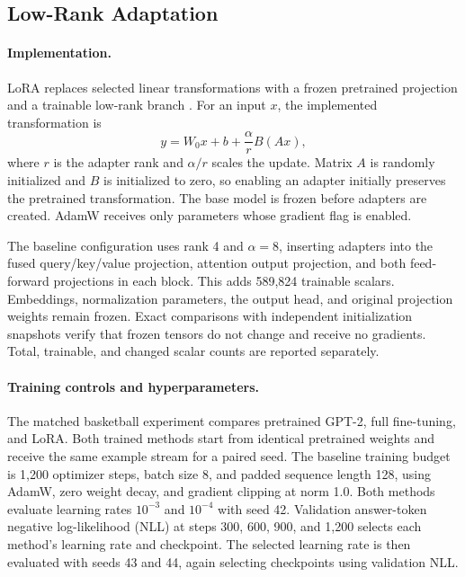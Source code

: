 \subsection{Low-Rank Adaptation}
\label{sec:method_lora}

\paragraph{Implementation.}
LoRA replaces selected linear transformations with a frozen pretrained projection and a trainable low-rank branch \cite{hu2021lora}. For an input $x$, the implemented transformation is
\begin{equation}
 y=W_0x+b+\frac{\alpha}{r}B(Ax),
\end{equation}
where $r$ is the adapter rank and $\alpha/r$ scales the update. Matrix $A$ is randomly initialized and $B$ is initialized to zero, so enabling an adapter initially preserves the pretrained transformation. The base model is frozen before adapters are created. AdamW receives only parameters whose gradient flag is enabled.

The baseline configuration uses rank 4 and $\alpha=8$, inserting adapters into the fused query/key/value projection, attention output projection, and both feed-forward projections in each block. This adds 589,824 trainable scalars. Embeddings, normalization parameters, the output head, and original projection weights remain frozen. Exact comparisons with independent initialization snapshots verify that frozen tensors do not change and receive no gradients. Total, trainable, and changed scalar counts are reported separately.

\paragraph{Training controls and hyperparameters.}
The matched basketball experiment compares pretrained GPT-2, full fine-tuning, and LoRA. Both trained methods start from identical pretrained weights and receive the same example stream for a paired seed. The baseline training budget is 1,200 optimizer steps, batch size 8, and padded sequence length 128, using AdamW, zero weight decay, and gradient clipping at norm 1.0. Both methods evaluate learning rates $10^{-3}$ and $10^{-4}$ with seed 42. Validation answer-token negative log-likelihood (NLL) at steps 300, 600, 900, and 1,200 selects each method's learning rate and checkpoint. The selected learning rate is then evaluated with seeds 43 and 44, again selecting checkpoints using validation NLL.

